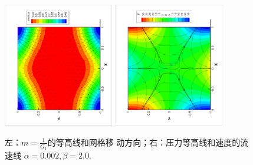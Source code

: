 \documentclass{report}
\theoremstyle{Remark}
\begin{document}
          \begin{figure}[ht]
            \begin{center}
              \includegraphics[width = 0.43\textwidth, angle = -90]{../picture_collidingFlow/mesh_move_direction.eps}
              \includegraphics[width = 0.43\textwidth, angle = -90]{../picture_collidingFlow/pressure_contour.eps}
              \caption{\small 左：$m = \frac{1}{G_1}$的等高线和网格移
                动方向；右：压力等高线和速度的流速线 $\alpha = 0.002, \beta = 2.0$.}
              \label{fig::mesh_move_direction}
            \end{center}
          \end{figure}
\end{document}
